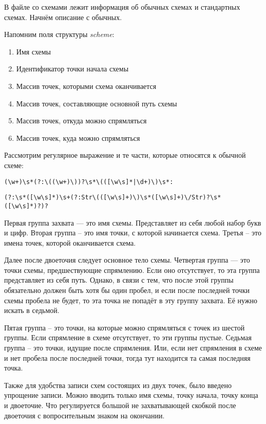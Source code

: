 \documentclass[12pt, a4 paper]{article}
\theoremstyle{plain}
\begin{document}
В файле со схемами лежит информация об обычных схемах и стандартных схемах. Начнём описание с обычных.

Напомним поля структуры \textit{scheme}:
\begin{enumerate}
	\item Имя схемы
	\item Идентификатор точки начала схемы
	\item Массив точек, которыми схема оканчивается
	\item Массив точек, составляющие основной путь схемы
	\item Массив точек, откуда можно спрямляться
	\item Массив точек, куда можно спрямляться
\end{enumerate}

Рассмотрим регулярное выражение и те части, которые относятся к обычной схеме:

\begin{verbatim}
(\w+)\s*(?:\((\w+)\))?\s*\(([\w\s]*|\d+)\)\s*:
\end{verbatim}

\begin{verbatim}
(?:\s*([\w\s]*)\s+(?:Str\(([\w\s]+)\)\s*([\w\s]+)\/Str)?\s*([\w\s]*)?)?
\end{verbatim}

Первая группа захвата — это имя схемы. Представляет из себя любой набор букв и цифр.
Вторая группа – это имя точки, с которой начинается схема.
Третья – это имена точек, которой оканчивается схема.

Далее после двоеточия следует основное тело схемы. Четвертая группа — это точки схемы, предшествующие спрямлению. Если оно отсутствует, то эта группа представляет из себя путь. Однако, в связи с тем, что после этой группы обязательно должен быть хотя бы один пробел, и если после последней точки схемы пробела не будет, то эта точка не попадёт в эту группу захвата. Её нужно искать в седьмой.

Пятая группа – это точки, на которые можно спрямляться с точек из шестой группы. Если спрямление в схеме отсутствует, то эти группы пустые. 
Седьмая группа – это точки, идущие после спрямления. Или, если нет спрямления в схеме и нет пробела после последней точки, тогда тут находится та самая последняя точка.

Также для удобства записи схем состоящих из двух точек, было введено упрощение записи. Можно вводить только имя схемы, точку начала, точку конца и двоеточие. Что регулируется большой не захватывающей скобкой после двоеточия с вопросительным знаком на окончании.
\end{document}
